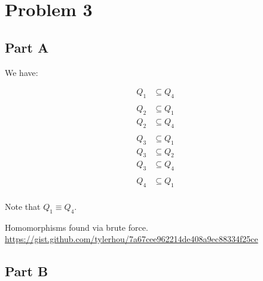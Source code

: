 \documentclass{article}
\begin{document}
\section{Problem 3}

\subsection{Part A}

We have:

\begin{align*}
    Q_1 &\subseteq Q_4      \tag{$h = (x, y) \to (x, y)$} \\
    \\
    Q_2 &\subseteq Q_1      \tag{$h = (x, y, z, u) \to (z, u, z, u)$} \\
    Q_2 &\subseteq Q_4      \tag{$h = (x, y, z, u) \to (x, y, x, x)$} \\
    \\
    Q_3 &\subseteq Q_1      \tag{$h = (x, y, z, u) \to (x, y, x, y)$} \\
    Q_3 &\subseteq Q_2      \tag{$h = (x, y, z, u) \to (x, y, z, x)$} \\
    Q_3 &\subseteq Q_4      \tag{$h = (x, y, z, u) \to (x, y, x, x)$} \\
    \\
    Q_4 &\subseteq Q_1      \tag{$h = (x, y, z, u) \to (x, y, x, y)$} \\
\end{align*}

Note that $Q_1 \equiv Q_4$.

Homomorphisms found via brute force. \url{https://gist.github.com/tylerhou/7a67cee962214de408a9ec88334f25ce}

\subsection{Part B}
\end{document}
